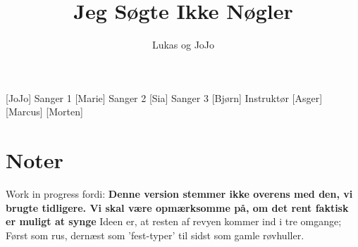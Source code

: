 \documentclass[a4paper,11pt]{article}
\title{Jeg Søgte Ikke Nøgler}
\author{Lukas og JoJo}
\begin{document}
\maketitle

\begin{roles}
[JoJo] Sanger 1
[Marie] Sanger 2
[Sia] Sanger 3
[Bjørn] Instruktør 
[Asger]
[Marcus]
[Morten]

\end{roles} 

\section*{Noter}
Work in progress fordi: 
\textbf{Denne version stemmer ikke overens med den, vi brugte tidligere. Vi skal være opmærksomme på, om det rent faktisk er muligt at synge} \newline 
Ideen er, at resten af revyen kommer ind i tre omgange; Først som rus, dernæst som 'fest-typer' til sidst som gamle røvhuller. 

\begin{props}
\prop{}
\prop{}
\prop{}
\prop{}
\prop{}
\end{props}
\end{document}

